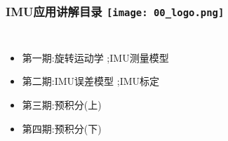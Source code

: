 



\begin{frame}
  \frametitle{IMU应用讲解目录 \hfill \texttt{[image: 00\_logo.png]}}
  \begin{columns}
    
    \begin{itemize}
      \item 第一期:旋转运动学 ;\quad IMU测量模型
      
      \item {\color{red}第二期:IMU误差模型 ;\quad IMU标定}

      \item 第三期:预积分(上)
      
      \item 第四期:预积分(下)


    \end{itemize}
    

  
  \end{columns}
  \end{frame}   